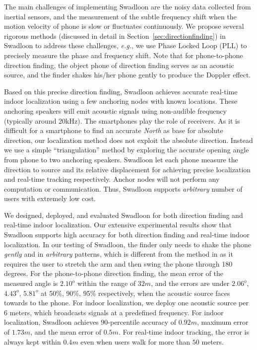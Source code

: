 \documentclass[]{sig-alternate-10pt}
\def\eg{\textit{e.g.}\xspace}
\def \ourprotocol{Swadloon\xspace}
\begin{document}
The main challenges of implementing \ourprotocol are the
 noisy data collected from inertial sensors, and the
 measurement of the subtle frequency shift when the motion velocity of
 phone is slow or fluctuates continuously.
We propose several rigorous methods (discussed in detail in
 Section~\ref{sec:directionfinding}) in \ourprotocol to address these
 challenges, \eg, we use Phase Locked Loop (PLL) to
 precisely measure the phase and frequency shift.
Note that for phone-to-phone direction finding,
 the object phone of direction finding serves as an acoustic source,
 and the finder shakes his/her phone gently to produce the Doppler effect.

Based on this precise  direction finding, \ourprotocol achieves
 accurate real-time indoor localization using a few anchoring
 nodes  with known locations.
These anchoring speakers will emit acoustic signals using non-audible
 frequency (typically around 20kHz).
The smartphones play the role of receivers.
As it is difficult for a smartphone to find an accurate \emph{North}
 as base for absolute direction, our localization method does not 
 exploit the  absolute direction.
Instead we use a simple ``triangulation'' method by exploring the
 accurate opening angle from phone to two anchoring speakers.
 \ourprotocol let each phone measure the direction to source and its relative displacement for achieving  precise localization and  real-time tracking respectively. Anchor nodes will not perform any computation or communication.  Thus, \ourprotocol  supports
 \emph{arbitrary} number of users with extremely low cost.


We designed, deployed, and evaluated \ourprotocol for both direction
 finding and  real-time indoor localization.
Our extensive experimental results show that
 \ourprotocol  supports high accuracy for both direction finding and
 real-time indoor  localization.
In our testing of \ourprotocol, the finder only needs to shake the phone
 \emph{gently} and in \emph{arbitrary} patterns, which is  different
 from  the method in 
 \cite{2012-MobiQuitous2011-ProposalDirectionEstimation} as it requires
 the user to stretch the arm and then swing the phone through 180 degrees.
 For the phone-to-phone direction finding, the mean error of
 the measured angle is $2.10^o$ within the range of $32m$, and the
 errors are under $2.06^o$, $4.43^o$, $5.81^o$  at  50\%, 90\%, 95\%
 respectively, when  the acoustic source faces towards to the phone. 
For indoor localization, we deploy one acoustic source  per 6 meters,
 which broadcasts signals at a predefined frequency.
For indoor localization, \ourprotocol  achieves $90$-percentile
 accuracy of $0.92m$, maximum error of $1.73m$, and the mean error of
 $0.5m$.
For real-time indoor tracking, the error is always kept within $0.4m$
 even when users walk for  more than $50$ meters.
\end{document}
